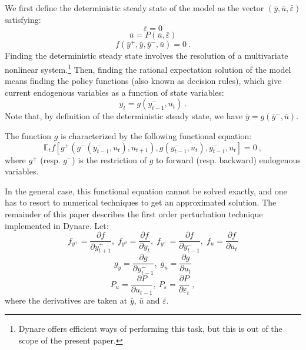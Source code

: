 \documentclass[11pt,a4paper]{article}
\begin{document}
We first define the deterministic steady state of the model as the vector
$(\bar{y}, \bar{u}, \bar{\varepsilon})$ satisfying:
\begin{equation*}
  \bar{\varepsilon} = 0
\end{equation*}
\begin{equation*}
  \bar{u} = P(\bar{u}, \bar{\varepsilon})
\end{equation*}
\begin{equation*}
  f(\bar{y}^+, \bar{y}, \bar{y}^-, \bar{u}) = 0 \: .
\end{equation*}
Finding the deterministic steady state involves the resolution of a
multivariate nonlinear system.\footnote{Dynare offers efficient ways of
  performing this task, but this is out of the scope of the present paper.}
Then, finding the rational expectation solution of the model means finding the
policy functions (also known as decision rules), which give current endogenous
variables as a function of state variables:
\begin{equation*}
  y_t = g(y^-_{t-1}, u_t) \: .
\end{equation*}
Note that, by definition of the deterministic steady state, we have $\bar{y} =
g(\bar{y}^-, \bar{u})$.

The function $g$ is characterized by the following functional equation:
\begin{equation}
  \label{eq:g-definition}
  \mathbb{E}_t f\left[g^+(g^-(y^-_{t-1}, u_t), u_{t+1}), g(y^-_{t-1}, u_t), y^-_{t-1}, u_t\right] = 0 \: ,
\end{equation}
where $g^+$ (resp. $g^-$) is the restriction of $g$ to forward (resp. backward)
endogenous variables.

In the general case, this functional equation cannot be solved exactly, and one
has to resort to numerical techniques to get an approximated solution. The
remainder of this paper describes the first order perturbation technique
implemented in Dynare. Let:
\begin{equation*}
  f_{y^+} = \frac{\partial f}{\partial y^+_{t+1}}, \; f_{y^0} = \frac{\partial f}{\partial y_t}, \;  f_{y^-} = \frac{\partial f}{\partial y^-_{t-1}}, \;
  f_u   = \frac{\partial f}{\partial u_t}
\end{equation*}
\begin{equation*}
  g_y = \frac{\partial g}{\partial y^-_{t-1}},\;
  g_u = \frac{\partial g}{\partial u_t}
\end{equation*}
\begin{equation*}
  P_u = \frac{\partial P}{\partial u_{t-1}}, \:
  P_\varepsilon = \frac{\partial P}{\partial \varepsilon_t} \: ,
\end{equation*}
where the derivatives are taken at $\bar{y}$, $\bar{u}$ and
$\bar{\varepsilon}$.
\end{document}
